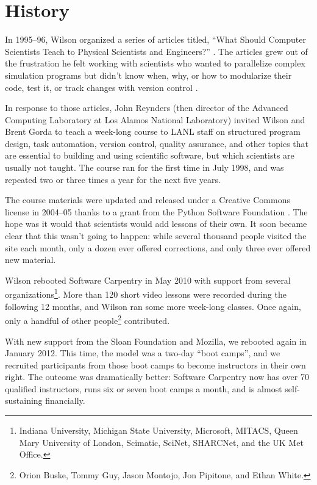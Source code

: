 \documentclass{article}
\begin{document}
\section{History}

In 1995--96,
Wilson organized a series of articles titled,
``What Should Computer Scientists Teach to Physical Scientists and Engineers?''
\cite{wilson1996}.
The articles grew out of the frustration he felt working with scientists
who wanted to parallelize complex simulation programs
but didn't know when, why, or how to modularize their code,
test it,
or track changes with version control
\cite{wilson2006a}.

In response to those articles,
John Reynders
(then director of the Advanced Computing Laboratory at Los Alamos National Laboratory)
invited Wilson and Brent Gorda to teach
a week-long course to LANL staff
on structured program design,
task automation,
version control,
quality assurance,
and other topics that are essential to building and using scientific software,
but which scientists are usually not taught.
The course ran for the first time in July 1998,
and was repeated two or three times a year
for the next five years.

The course materials were updated and released under a Creative Commons license in 2004--05
thanks to a grant from the Python Software Foundation \cite{wilson2006b}.
The hope was it would that scientists would add lessons of their own.
It soon became clear that this wasn't going to happen:
while several thousand people visited the site each month,
only a dozen ever offered corrections,
and only three ever offered new material.

Wilson rebooted Software Carpentry in May 2010
with support from several organizations\footnote{Indiana University,
Michigan State University,
Microsoft,
MITACS,
Queen Mary University of London,
Scimatic,
SciNet,
SHARCNet,
and the UK Met Office.}.
More than 120 short video lessons were recorded during the following 12 months,
and Wilson ran some more week-long classes.
Once again,
only a handful of other people\footnote{Orion Buske, Tommy Guy, Jason Montojo, Jon Pipitone, and Ethan White.} contributed.

With new support from the Sloan Foundation and Mozilla,
we rebooted again in January 2012.
This time,
the model was a two-day ``boot camps'',
and we recruited participants from those boot camps
to become instructors in their own right.
The outcome was dramatically better:
Software Carpentry now has over 70 qualified instructors,
runs six or seven boot camps a month,
and is almost self-sustaining financially.
\end{document}
